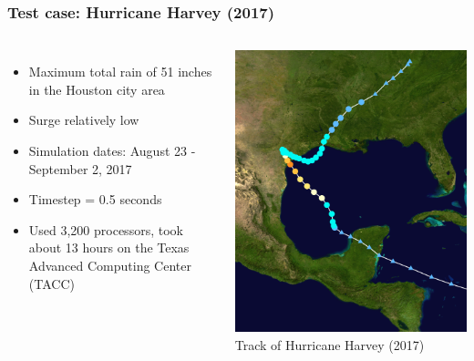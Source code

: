 \documentclass[10pt]{oden_beamer}
\begin{document}

\begin{frame}
  \frametitle{Test case: Hurricane Harvey (2017)}
  \begin{columns}
  \begin{itemize}
  \item Maximum total rain of 51 inches in the Houston city area
  \item Surge relatively low
  \item Simulation dates: August 23 - September 2, 2017
  \item Timestep = 0.5 seconds
  \item Used 3,200 processors, took about 13 hours on the Texas Advanced Computing Center (TACC)
  \end{itemize}

  \centering
  \includegraphics[width=0.8\linewidth]{harvey_cropped.png} \\
  \footnotesize Track of Hurricane Harvey (2017)
  \end{columns}

\end{frame}
\end{document}
